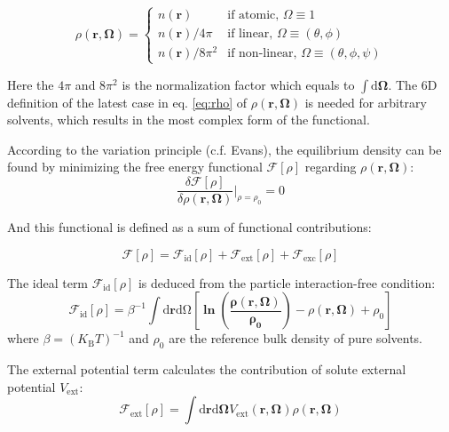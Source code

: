 \begin{equation}
\rho(\mathbf{r},\mathbf{\Omega})=\left\{ \begin{array}{ll}
n(\mathbf{r}) & \mbox{if atomic, }\Omega\equiv1\\
n(\mathbf{r})/4\pi & \mbox{if linear, }\Omega\equiv(\theta,\phi)\\
n(\mathbf{r})/8\pi^{2} & \mbox{if non-linear, }\Omega\equiv(\theta,\phi,\psi)
\end{array}\right.\label{eq:rho}
\end{equation}


Here the $4\pi$ and $8\pi^{2}$ is the normalization factor which equals
to $\int\mathrm{d}\mathbf{\Omega}$. The 6D definition of the latest
case in eq. \ref{eq:rho} of $\rho(\mathbf{r},\mathbf{\Omega})$ is
needed for arbitrary solvents, which results in the most complex form
of the functional. 

According to the variation principle (c.f. Evans), the equilibrium
density can be found by minimizing the free energy functional $\mathcal{F}[\rho]$
regarding $\rho(\mathbf{r},\mathbf{\Omega})$: 
\begin{equation}
\frac{\delta\mathcal{F}[\rho]}{\delta\rho(\mathbf{r},\mathbf{\Omega})}|_{\rho=\rho_{0}}=0
\end{equation}


And this functional is defined as a sum of functional contributions: 

\begin{equation}
\mathcal{F}[\rho]=\mathcal{F}_{\mathrm{id}}[\rho]+\mathcal{F}_{\mathrm{ext}}[\rho]+\mathcal{F}_{\mathrm{exc}}[\rho]
\end{equation}


The ideal term $\mathcal{F}_{\mathrm{id}}[\rho]$ is deduced from
the particle interaction-free condition: 
\begin{equation}
\mathcal{F}_{\mathrm{id}}[\rho]=\beta^{-1}\int\mathrm{d}\mathbf{r}\mathrm{d\Omega}\left[\mathbf{\mathbf{\ln\left(\frac{\rho(\mathbf{r},\mathbf{\mathbf{\mathbf{\mathbf{\Omega}}}})}{\rho_{0}}\right)}}-\rho(\mathbf{r},\mathbf{\mathbf{\mathbf{\Omega}}})+\rho_{0}\right]
\end{equation}
where $\beta=\left(K_{\mathrm{B}}T\right)^{-1}$ and $\rho_{0}$ are
the reference bulk density of pure solvents. 

The external potential term calculates the contribution of solute
external potential $V_{\mathrm{ext}}$: 
\begin{equation}
\mathcal{F}_{\mathrm{ext}}[\rho]=\int\mathrm{d}\mathbf{r}\mathrm{d}\mathbf{\mathbf{\Omega}}V_{\mathrm{ext}}(\mathbf{r},\mathbf{\mathbf{\mathbf{\mathbf{\Omega}}}})\rho(\mathbf{r},\mathbf{\mathbf{\mathbf{\mathbf{\Omega}}}})
\end{equation}


